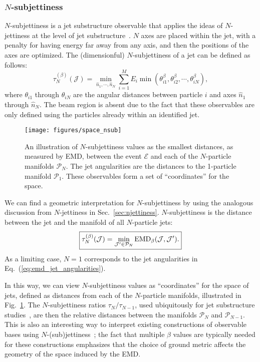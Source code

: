 \documentclass[letterpaper,11pt]{article}
\DeclareRobustCommand{\Sec}[1]{Sec.~\ref{#1}}
\DeclareRobustCommand{\Fig}[1]{Fig.~\ref{#1}}
\DeclareRobustCommand{\Eq}[1]{Eq.~(\ref{#1})}
\begin{document}
\subsubsection{$N$-subjettiness}
\label{subsec:nsubjettiness}


$N$-subjettiness is a jet substructure observable that applies the ideas of $N$-jettiness at the level of jet substructure~\cite{Thaler:2010tr,Thaler:2011gf}.
%
$N$ axes are placed within the jet, with a penalty for having energy far away from any axis, and then the positions of the axes are optimized.
%
The (dimensionful) $N$-subjettiness of a jet can be defined as follows:
%
\begin{equation}
\tau_N^{(\beta)} (\mathcal J) = \min_{\hat n_1,\cdots,\hat n_N} \sum_{i=1}^M E_i \min\left(\theta_{i1}^\beta, \theta_{i2}^\beta, \cdots, \theta_{iN}^\beta\right),
\end{equation}
where $\theta_{i1}$ through $\theta_{iN}$ are the angular distances between particle $i$ and axes $\hat n_1$ through $\hat n_N$.
%
The beam region is absent due to the fact that these observables are only defined using the particles already within an identified jet.


\begin{figure}[p]
\centering
\texttt{[image: figures/space\_nsub]}
\caption{\label{fig:space_nsub} An illustration of $N$-subjettiness values as the smallest distances, as measured by EMD, between the event $\mathcal E$ and each of the $N$-particle manifolds $\mathcal P_N$.
%
The jet angularities are the distances to the 1-particle manifold $\mathcal P_1$.
%
These observables form a set of ``coordinates'' for the space.
}
\end{figure}


We can find a geometric interpretation for $N$-subjettiness by using the analogous discussion from $N$-jettiness in \Sec{sec:njettiness}.
%
$N$-subjettiness is the distance between the jet and the manifold of all $N$-particle jets:
%
\begin{equation}
\begin{boxed}{
\tau_N^{(\beta)}(\mathcal J) = \min_{\mathcal J'\in\mathcal P_N} \text{EMD}_{\beta}(\mathcal J, \mathcal J').
}\end{boxed}
\end{equation}
%
As a limiting case, $N = 1$ corresponds to the jet angularities in \Eq{eq:emd_jet_angularities}.


In this way, we can view $N$-subjettiness values as ``coordinates'' for the space of jets, defined as distances from each of the $N$-particle manifolds, illustrated in \Fig{fig:space_nsub}.
%
The $N$-subjettiness ratios $\tau_{N} / \tau_{N-1}$, used ubiquitously for jet substructure studies~\cite{Larkoski:2017jix,Asquith:2018igt,Marzani:2019hun}, are then the relative distances between the manifolds $\mathcal{P}_N$ and $\mathcal{P}_{N-1}$.
%
This is also an interesting way to interpret existing constructions of observable bases using $N$-(sub)jettiness~\cite{Datta:2017rhs,Datta:2017lxt,Larkoski:2019nwj}; the fact that multiple $\beta$ values are typically needed for these constructions emphasizes that the choice of ground metric affects the geometry of the space induced by the EMD.
\end{document}
